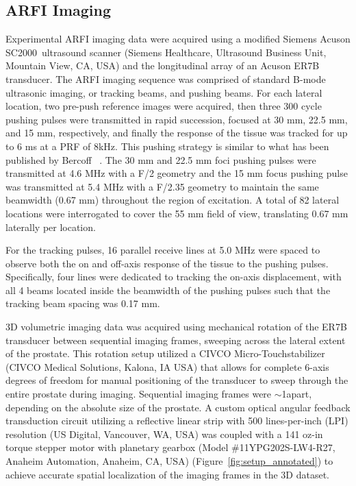 \subsection{ARFI Imaging}
Experimental ARFI imaging data were acquired using a modified Siemens Acuson
SC2000\texttrademark~ultrasound scanner (Siemens Healthcare, Ultrasound Business Unit,
Mountain View, CA, USA) and the longitudinal array of an Acuson ER7B
transducer.  The ARFI imaging sequence was comprised of
standard B-mode ultrasonic imaging, or tracking beams, and pushing beams. For
each lateral location, two pre-push reference images were acquired, then three
300 cycle pushing pulses were transmitted in rapid succession, focused at 30
mm, 22.5 mm, and 15 mm, respectively, and finally the response of the tissue
was tracked for up to 6 ms at a PRF of 8kHz. This pushing strategy is similar to
what has been published by Bercoff \etal~\cite{Bercoff2004}. The 30 mm and 22.5
mm foci pushing pulses were transmitted at 4.6 MHz with a F/2 geometry and the
15 mm focus pushing pulse was transmitted at 5.4 MHz with a F/2.35 geometry to
maintain the same beamwidth (0.67 mm) throughout the region of excitation. A
total of 82 lateral locations were interrogated to cover the 55 mm field of
view, translating 0.67 mm laterally per location.

For the tracking pulses, 16 parallel receive lines at 5.0 MHz were spaced to
observe both the on and off-axis response of the tissue to the pushing pulses.
Specifically, four lines were dedicated to tracking the on-axis displacement,
with all 4 beams located inside the beamwidth of the pushing pulses such that
the tracking beam spacing was 0.17 mm. 

3D volumetric imaging data was acquired using mechanical rotation of the ER7B
transducer between sequential imaging frames, sweeping across the lateral
extent of the prostate.  This rotation setup utilized a CIVCO
Micro-Touch\texttrademark stabilizer (CIVCO Medical Solutions, Kalona, IA USA)
that allows for complete 6-axis degrees of freedom for manual positioning of
the transducer to sweep through the entire prostate during imaging.  Sequential
imaging frames were $\sim$1\degree apart, depending on the absolute size of the
prostate.  A custom optical angular feedback transduction circuit utilizing a
reflective linear strip with 500 lines-per-inch (LPI) resolution (US Digital,
Vancouver, WA, USA) was coupled with a 141 oz-in torque stepper motor with
planetary gearbox (Model \#11YPG202S-LW4-R27, Anaheim Automation, Anaheim, CA,
USA) (Figure~\ref{fig:setup_annotated}) to achieve accurate spatial
localization of the imaging frames in the 3D dataset.

